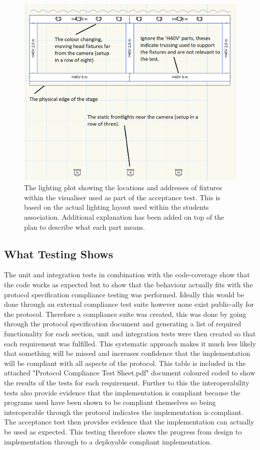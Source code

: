 \documentclass[11pt,a4paper]{report}
\begin{document}
\begin{figure}[H]
	\label{ACCEPTANCE_TEST_LX_PLOT}
	\includegraphics[width=\textwidth]{Union-Setup-Vision-File-LX-Plot.png}
	\caption{The lighting plot showing the locations and addresses of fixtures within the visualiser used as part of the acceptance test. This is based on the actual lighting layout used within the students association. Additional explanation has been added on top of the plan to describe what each part means.}
\end{figure}

\subsection{What Testing Shows}
The unit and integration tests in combination with the code-coverage show that the code works as expected but to show that the behaviour actually fits with the protocol specification compliance testing was performed. Ideally this would be done through an external compliance test suite however none exist public-ally for the protocol. Therefore a compliance suite was created, this was done by going through the protocol specification document \cite{ANSI_E1.31} and generating a list of required functionality for each section, unit and integration tests were then created so that each requirement was fulfilled. This systematic approach makes it much less likely that something will be missed and increases confidence that the implementation will be compliant with all aspects of the protocol. This table is included in the attached "Protocol Compliance Test Sheet.pdf" document coloured coded to show the results of the tests for each requirement. Further to this the interoperability tests also provide evidence that the implementation is compliant because the programs used have been shown to be compliant themselves so being interoperable through the protocol indicates the implementation is compliant. The acceptance test then provides evidence that the implementation can actually be used as expected. This testing therefore shows the progress from design to implementation through to a deployable compliant implementation.
\end{document}
